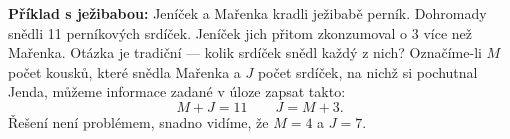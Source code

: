 
\begin{example}\label{mai:exam005}
  \textbf{Příklad s ježibabou:}\newline
  Jeníček a Mařenka kradli ježibabě perník. Dohromady snědli 11 perníkových srdíček. Jeníček jich 
  přitom zkonzumoval o 3 více než Mařenka. Otázka je tradiční — kolik srdíček snědl každý z nich?
  Označíme-li \(M\) počet kousků, které snědla Mařenka a \(J\) počet srdíček, na nichž si pochutnal 
  Jenda, můžeme informace zadané v úloze zapsat takto:
    \begin{equation*}
      M + J = 11 \qquad J = M + 3.
    \end{equation*}
  Řešení není problémem, snadno vidíme, že \(M = 4\) a \(J = 7\).
\end{example}